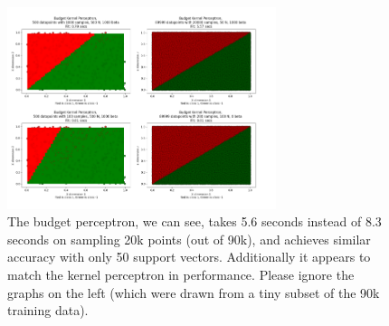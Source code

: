 \documentclass[submit]{harvardml}
\newenvironment{answer}{%
    \color{answergreen}\bf}
  {%
  }
\begin{document}
\begin{enumerate}
\begin{answer}
            \begin{figure}[H]
                \centering
                \includegraphics[width=0.7\textwidth]{budget.png}
                \caption{The budget perceptron, we can see, takes 5.6 seconds instead of 8.3 seconds
                on sampling 20k points (out of 90k), and achieves similar accuracy with only 50
            support vectors. Additionally it appears to match the kernel perceptron in performance. Please ignore the graphs on the left (which were drawn from a tiny
        subset of the 90k training data).}
                \label{Problem 1, part 1.}
            \end{figure}





\end{answer}
\end{enumerate}
\end{document}
